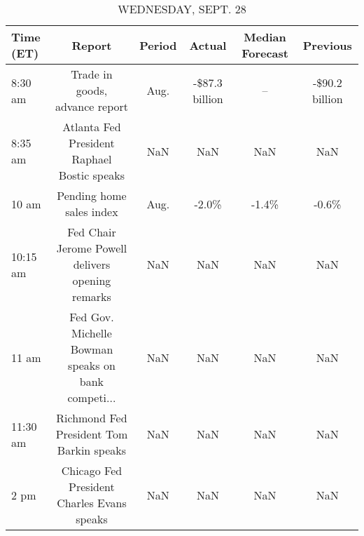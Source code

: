 \documentclass{article}%
\begin{document}
\begin{table}[htbp]%
\caption{WEDNESDAY, SEPT. 28}%
\centering%
\begin{adjustbox}{width=1\textwidth}%
\begin{tabular}{lccccc}
\toprule
Time (ET) &                                             Report & Period &         Actual & Median Forecast &       Previous \\
\midrule
  8:30 am &                     Trade in goods, advance report &   Aug. & -\$87.3 billion &              -- & -\$90.2 billion \\
  8:35 am &        Atlanta Fed President Raphael Bostic speaks &    NaN &            NaN &             NaN &            NaN \\
    10 am &                           Pending home sales index &   Aug. &          -2.0\% &           -1.4\% &          -0.6\% \\
 10:15 am &   Fed Chair Jerome Powell delivers opening remarks &    NaN &            NaN &             NaN &            NaN \\
    11 am & Fed Gov. Michelle Bowman speaks on bank competi... &    NaN &            NaN &             NaN &            NaN \\
 11:30 am &           Richmond Fed President Tom Barkin speaks &    NaN &            NaN &             NaN &            NaN \\
     2 pm &         Chicago Fed President Charles Evans speaks &    NaN &            NaN &             NaN &            NaN \\
\bottomrule
\end{tabular}
%
\end{adjustbox}%
\end{table}

%
\end{document}
